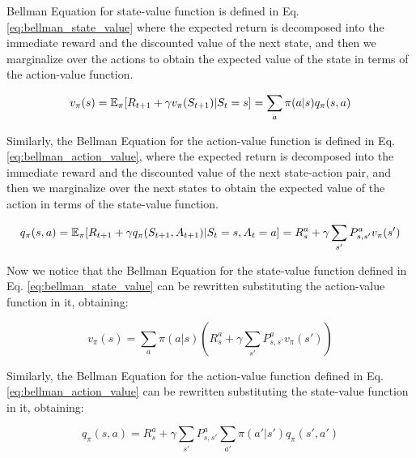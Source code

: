 Bellman Equation for state-value function is defined in Eq. \ref{eq:bellman_state_value} where the expected return is decomposed into the immediate reward and the discounted value of the next state, and then we marginalize over the actions to obtain the expected value of the state in terms of the action-value function.

\begin{equation} \label{eq:bellman_state_value}
    v_{\pi}(s) = \operatorname{\mathbb{E}}_{\pi}[R_{t+1} + \gamma v_{\pi}(S_{t+1}) | S_t = s] = \sum_{a} \pi(a|s)q_{\pi}(s, a)
\end{equation}

Similarly, the Bellman Equation for the action-value function is defined in Eq. \ref{eq:bellman_action_value}, where the expected return is decomposed into the immediate reward and the discounted value of the next state-action pair, and then we marginalize over the next states to obtain the expected value of the action in terms of the state-value function.

\begin{equation} \label{eq:bellman_action_value}
    q_{\pi}(s, a) = \operatorname{\mathbb{E}}_{\pi}[R_{t+1} + \gamma q_{\pi}(S_{t+1}, A_{t+1}) | S_t = s, A_t = a] = R_s^a + \gamma \sum_{s'} P_{s, s'}^a v_{\pi}(s')
\end{equation}

Now we notice that the Bellman Equation for the state-value function defined in Eq. \ref{eq:bellman_state_value} can be rewritten substituting the action-value function in it, obtaining:

\begin{equation}
    v_{\pi}(s) = \sum_{a} \pi(a|s)(R_s^a + \gamma \sum_{s'} P_{s, s'}^a v_{\pi}(s'))
\end{equation}

Similarly, the Bellman Equation for the action-value function defined in Eq. \ref{eq:bellman_action_value} can be rewritten substituting the state-value function in it, obtaining:

\begin{equation}
    q_{\pi}(s, a) = R_s^a + \gamma \sum_{s'} P_{s, s'}^a \sum_{a'} \pi(a'|s')q_{\pi}(s', a')
\end{equation}



